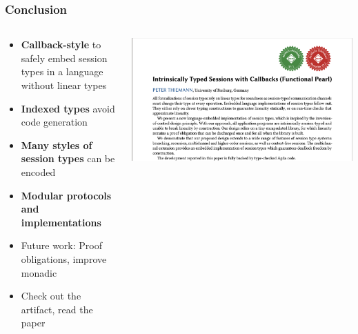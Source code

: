 \documentclass[dvipsnames,aspectratio=169,pdftex]{beamer}
\begin{document}
\begin{frame}
  \frametitle{Conclusion}
  \begin{columns}
    \begin{column}{0.59\textwidth}
      \begin{itemize}
      \item \textbf{Callback-style} to safely embed session types in a
        language without linear types
      \item \textbf{Indexed types} avoid code generation
      \item \textbf{Many styles of session types} can be encoded
      \item \textbf{Modular protocols and implementations}
      \item Future work: Proof obligations, improve monadic
      \item Check out the artifact, read the paper
      \end{itemize}
    \end{column}
    \begin{column}{0.39\textwidth}
      \begin{center}
        \includegraphics[scale=0.15,trim={0 0 0 0},clip]{images/this-paper}
      \end{center}
    \end{column}
  \end{columns}
\end{frame}
\end{document}

